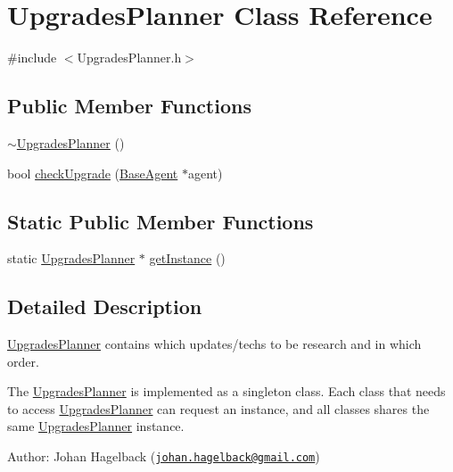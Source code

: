 \hypertarget{class_upgrades_planner}{
\section{UpgradesPlanner Class Reference}
\label{class_upgrades_planner}
}


{\ttfamily \#include $<$UpgradesPlanner.h$>$}

\subsection*{Public Member Functions}
\begin{DoxyCompactItemize}
\item 
\hyperlink{class_upgrades_planner_adca8c838dbffb0b1e9d6460e180b214c}{$\sim$UpgradesPlanner} ()
\item 
bool \hyperlink{class_upgrades_planner_ad012551792d7c672038a34dcb634b685}{checkUpgrade} (\hyperlink{class_base_agent}{BaseAgent} $\ast$agent)
\end{DoxyCompactItemize}
\subsection*{Static Public Member Functions}
\begin{DoxyCompactItemize}
\item 
static \hyperlink{class_upgrades_planner}{UpgradesPlanner} $\ast$ \hyperlink{class_upgrades_planner_a6572326e44b217b8ee85d542fabc538a}{getInstance} ()
\end{DoxyCompactItemize}


\subsection{Detailed Description}
\hyperlink{class_upgrades_planner}{UpgradesPlanner} contains which updates/techs to be research and in which order.

The \hyperlink{class_upgrades_planner}{UpgradesPlanner} is implemented as a singleton class. Each class that needs to access \hyperlink{class_upgrades_planner}{UpgradesPlanner} can request an instance, and all classes shares the same \hyperlink{class_upgrades_planner}{UpgradesPlanner} instance.

Author: Johan Hagelback (\href{mailto:johan.hagelback@gmail.com}{\tt johan.hagelback@gmail.com}) 

